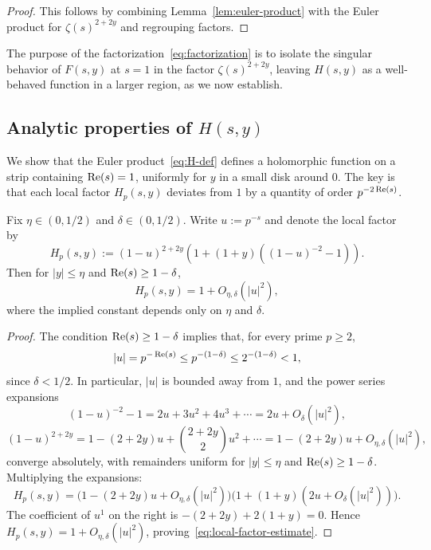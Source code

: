 \begin{proof}
This follows by combining Lemma~\ref{lem:euler-product} with the
Euler product for $\zeta(s)^{2+2y}$ and regrouping factors.
\end{proof}

The purpose of the factorization~\eqref{eq:factorization} is to
isolate the singular behavior of $F(s, y)$ at $s = 1$ in the
factor $\zeta(s)^{2+2y}$, leaving $H(s, y)$ as a well-behaved
function in a larger region, as we now establish.

\subsection{Analytic properties of \texorpdfstring{$H(s, y)$}{H(s,y)}}\label{sec:H-analytic}

We show that the Euler product~\eqref{eq:H-def} defines a
holomorphic function on a strip containing $\operatorname{Re}(s) = 1$,
uniformly for $y$ in a small disk around $0$. The key is that
each local factor $H_p(s, y)$ deviates from $1$ by a quantity of
order $p^{-2\operatorname{Re}(s)}$.

\begin{lemma}\label{lem:local-factor-estimate}
Fix $\eta \in (0, 1/2)$ and $\delta \in (0, 1/2)$. Write
$u := p^{-s}$ and denote the local factor by
\begin{equation}\label{eq:Hp-def}
    H_p(s, y) := (1 - u)^{2+2y}\left(1 + (1+y)\left((1-u)^{-2} - 1\right)\right).
\end{equation}
Then for $|y| \leq \eta$ and $\operatorname{Re}(s) \geq 1 - \delta$,
\begin{equation}\label{eq:local-factor-estimate}
    H_p(s, y) = 1 + O_{\eta, \delta}(|u|^2),
\end{equation}
where the implied constant depends only on $\eta$ and $\delta$.
\end{lemma}

\begin{proof}
The condition $\operatorname{Re}(s) \geq 1 - \delta$ implies that, for every
prime $p \geq 2$,
\[
    |u| = p^{-\operatorname{Re}(s)} \leq p^{-(1 - \delta)} \leq 2^{-(1-\delta)} < 1,
\]
since $\delta < 1/2$. In particular, $|u|$ is bounded away from
$1$, and the power series expansions
\[
    (1 - u)^{-2} - 1 = 2u + 3u^2 + 4u^3 + \cdots = 2u + O_\delta(|u|^2),
\]
\[
    (1 - u)^{2+2y} = 1 - (2+2y)u + \binom{2+2y}{2}u^2 + \cdots
                   = 1 - (2+2y)u + O_{\eta, \delta}(|u|^2),
\]
converge absolutely, with remainders uniform for $|y| \leq \eta$
and $\operatorname{Re}(s) \geq 1 - \delta$. Multiplying the expansions:
\[
    H_p(s, y) = \bigl(1 - (2+2y)u + O_{\eta, \delta}(|u|^2)\bigr)
                \bigl(1 + (1+y)(2u + O_\delta(|u|^2))\bigr).
\]
The coefficient of $u^1$ on the right is $-(2+2y) + 2(1+y) = 0$.
Hence $H_p(s, y) = 1 + O_{\eta, \delta}(|u|^2)$,
proving~\eqref{eq:local-factor-estimate}.
\end{proof}

